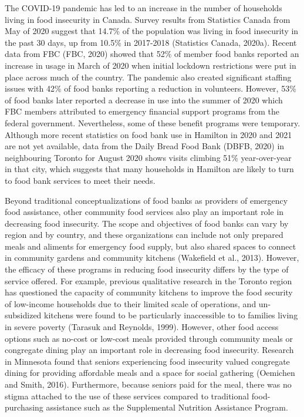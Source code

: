\documentclass[]{elsarticle} %
\begin{document}
The COVID-19 pandemic has led to an increase in the number of households
living in food insecurity in Canada. Survey results from Statistics
Canada from May of 2020 suggest that 14.7\% of the population was living
in food insecurity in the past 30 days, up from 10.5\% in 2017-2018
(Statistics Canada, 2020a). Recent data from FBC (FBC, 2020) showed that
52\% of member food banks reported an increase in usage in March of 2020
when initial lockdown restrictions were put in place across much of the
country. The pandemic also created significant staffing issues with 42\%
of food banks reporting a reduction in volunteers. However, 53\% of food
banks later reported a decrease in use into the summer of 2020 which FBC
members attributed to emergency financial support programs from the
federal government. Nevertheless, some of these benefit programs were
temporary. Although more recent statistics on food bank use in Hamilton
in 2020 and 2021 are not yet available, data from the Daily Bread Food
Bank (DBFB, 2020) in neighbouring Toronto for August 2020 shows visits
climbing 51\% year-over-year in that city, which suggests that many
households in Hamilton are likely to turn to food bank services to meet
their needs.

Beyond traditional conceptualizations of food banks as providers of
emergency food assistance, other community food services also play an
important role in decreasing food insecurity. The scope and objectives
of food banks can vary by region and by country, and these organizations
can include not only prepared meals and aliments for emergency food
supply, but also shared spaces to connect in community gardens and
community kitchens (Wakefield et al., 2013). However, the efficacy of
these programs in reducing food insecurity differs by the type of
service offered. For example, previous qualitative research in the
Toronto region has questioned the capacity of community kitchens to
improve the food security of low-income households due to their limited
scale of operations, and un-subsidized kitchens were found to be
particularly inaccessible to to families living in severe poverty
(Tarasuk and Reynolds, 1999). However, other food access options such as
no-cost or low-cost meals provided through community meals or congregate
dining play an important role in decreasing food insecurity. Research in
Minnesota found that seniors experiencing food insecurity valued
congregate dining for providing affordable meals and a space for social
gathering (Oemichen and Smith, 2016). Furthermore, because seniors paid
for the meal, there was no stigma attached to the use of these services
compared to traditional food-purchasing assistance such as the
Supplemental Nutrition Assistance Program.
\end{document}
